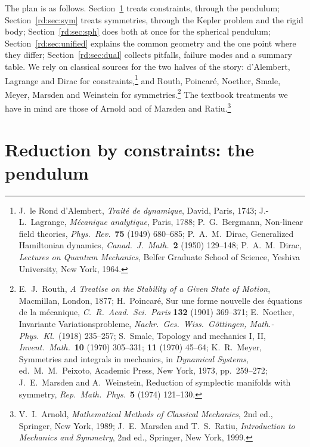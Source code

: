 The plan is as follows. Section~\ref{rd:sec:con} treats constraints, through the pendulum; Section~\ref{rd:sec:sym} treats symmetries, through the Kepler problem and the rigid body; Section~\ref{rd:sec:sph} does both at once for the spherical pendulum; Section~\ref{rd:sec:unified} explains the common geometry and the one point where they differ; Section~\ref{rd:sec:dual} collects pitfalls, failure modes and a summary table. We rely on classical sources for the two halves of the story: d'Alembert, Lagrange and Dirac for constraints,\footnote{J.\ le Rond d'Alembert, \emph{Trait\'e de dynamique}, David, Paris, 1743; J.-L.\ Lagrange, \emph{M\'ecanique analytique}, Paris, 1788; P.\ G.\ Bergmann, Non-linear field theories, \emph{Phys.\ Rev.}\ \textbf{75} (1949) 680--685; P.\ A.\ M.\ Dirac, Generalized Hamiltonian dynamics, \emph{Canad.\ J.\ Math.}\ \textbf{2} (1950) 129--148; P.\ A.\ M.\ Dirac, \emph{Lectures on Quantum Mechanics}, Belfer Graduate School of Science, Yeshiva University, New York, 1964.} and Routh, Poincar\'e, Noether, Smale, Meyer, Marsden and Weinstein for symmetries.\footnote{E.\ J.\ Routh, \emph{A Treatise on the Stability of a Given State of Motion}, Macmillan, London, 1877; H.\ Poincar\'e, Sur une forme nouvelle des \'equations de la m\'ecanique, \emph{C.\ R.\ Acad.\ Sci.\ Paris} \textbf{132} (1901) 369--371; E.\ Noether, Invariante Variationsprobleme, \emph{Nachr.\ Ges.\ Wiss.\ G\"ottingen, Math.-Phys.\ Kl.}\ (1918) 235--257; S.\ Smale, Topology and mechanics I, II, \emph{Invent.\ Math.}\ \textbf{10} (1970) 305--331; \textbf{11} (1970) 45--64; K.\ R.\ Meyer, Symmetries and integrals in mechanics, in \emph{Dynamical Systems}, ed.\ M.\ M.\ Peixoto, Academic Press, New York, 1973, pp.\ 259--272; J.\ E.\ Marsden and A.\ Weinstein, Reduction of symplectic manifolds with symmetry, \emph{Rep.\ Math.\ Phys.}\ \textbf{5} (1974) 121--130.} The textbook treatments we have in mind are those of Arnold and of Marsden and Ratiu.\footnote{V.\ I.\ Arnold, \emph{Mathematical Methods of Classical Mechanics}, 2nd ed., Springer, New York, 1989; J.\ E.\ Marsden and T.\ S.\ Ratiu, \emph{Introduction to Mechanics and Symmetry}, 2nd ed., Springer, New York, 1999.}

\section{Reduction by constraints: the pendulum}\label{rd:sec:con}


